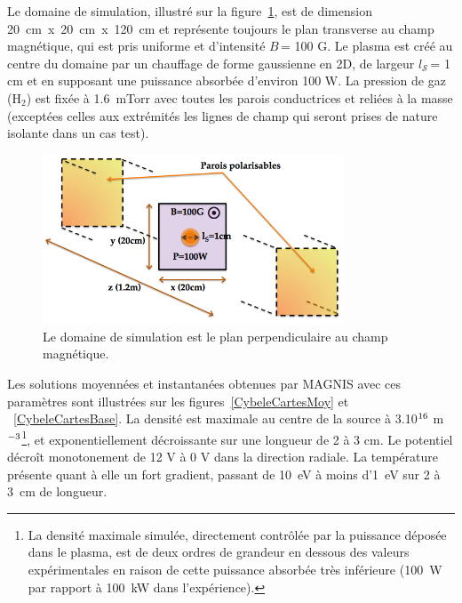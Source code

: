 \begin{refsection}
 Le domaine de
simulation, illustré sur la figure~\ref{4-cybeleSimDomain}, est de dimension
20~cm~x~20~cm~x~120~cm et représente toujours le plan transverse au champ
magnétique, qui est pris uniforme et d'intensité $B\,$= 100 G. Le plasma est créé au centre du domaine par un chauffage de forme gaussienne en 2D, de largeur $l_\mathcal{S}\,$= 1 cm et en supposant une puissance absorbée
d'environ 100 W.
La pression de gaz (H$_2$) est fixée à 1.6~mTorr avec toutes les parois
conductrices et reliées à la masse (exceptées celles aux extrémités les lignes
de champ qui seront prises de nature isolante dans un cas test).


\begin{figure}[!htbp]
\centering
\includegraphics[width=0.8\textwidth]{figures/4-cybeleSimDomain.png}
{\caption{Le domaine de simulation est le plan perpendiculaire au champ
magnétique.}
\label{4-cybeleSimDomain}}
\end{figure}

Les solutions moyennées et instantanées obtenues par MAGNIS avec ces paramètres
sont illustrées sur les figures~\ref{CybeleCartesMoy} et
~\ref{CybeleCartesBase}. La densité est maximale au centre
de la source à 3.10$^{{16}}$ m$^{{-3}}$\footnote{La densité
maximale simulée, directement contrôlée par la puissance
déposée dans le plasma, est de deux ordres de grandeur en dessous des valeurs
expérimentales en raison de cette puissance absorbée très inférieure (100~W par
rapport à 100~kW dans l'expérience).}, et exponentiellement
décroissante sur une longueur de 2 à 3 cm.
Le potentiel décroît monotonement de 12 V à 0 V dans la direction radiale.
 La température présente quant à elle un fort gradient, passant de 10~eV à moins
 d'1~eV sur 2 à 3~cm de longueur.


\end{refsection}
